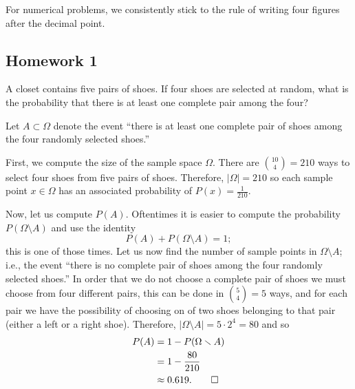 For numerical problems, we consistently stick to the rule of writing four
figures after the decimal point.

\subsection{Homework 1}
\begin{problem}[Handout 1, \# 5]
  A closet contains five pairs of shoes. If four shoes are selected at
  random, what is the probability that there is at least one complete pair
  among the four?
\end{problem}
\begin{solution*}
  Let \(A\subset\Omega\) denote the event ``there is at least one complete
  pair of shoes among the four randomly selected shoes.''

  First, we compute the size of the sample space \(\Omega\). There are
  \(\binom{10}{4}=210\) ways to select four shoes from five pairs of
  shoes. Therefore, \(|\Omega|=210\) so each sample point \(x\in\Omega\)
  has an associated probability of \(P(x)=\frac{1}{210}\).

  Now, let us compute \(P(A)\). Oftentimes it is easier to compute the
  probability \(P(\Omega\setminus A)\) and use the identity
  \[
    P(A)+P(\Omega\setminus A)=1;
  \]
  this is one of those times. Let us now find the number of sample points
  in \(\Omega\setminus A\); i.e., the event ``there is no complete pair of
  shoes among the four randomly selected shoes.'' In order that we do not
  choose a complete pair of shoes we must choose from four different pairs,
  this can be done in \(\binom{5}{4}=5\) ways, and for each pair we have
  the possibility of choosing on of two shoes belonging to that pair
  (either a left or a right shoe). Therefore,
  \(|\Omega\setminus A|=5\cdot 2^4=80\) and so
  \begin{align*}
    P(A)
    &=1-P(\Omega\setminus A)\\
    &=1-\frac{80}{210}\\
    &\approx0.619.\qedhere
  \end{align*}
\end{solution*}

